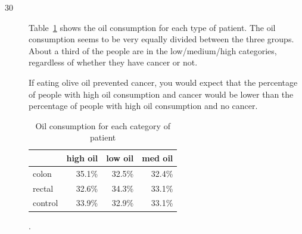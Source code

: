 \documentclass[letterpaper, landscape]{exam}
\begin{document}
\begin{description}
    \item[30]



      Table~\ref{tab:ex30b} shows the oil consumption for each type of patient.
      The oil consumption seems to be very equally divided between the three
      groups.  About a third of the people are in the low/medium/high
      categories, regardless of whether they have cancer or not.

      If eating olive oil prevented cancer, you would expect that the percentage
      of people with high oil consumption and cancer would be lower than the
      percentage of people with high oil consumption and no cancer.

      \begin{table}[H]
        \centering
        \begin{tabular}{lrrr}
          \toprule
                  & high oil & low oil & med oil \\
          \midrule
          colon   & 35.1\%   & 32.5\%  & 32.4\% \\
          rectal  & 32.6\%   & 34.3\%  & 33.1\% \\
          control & 33.9\%   & 32.9\%  & 33.1\% \\
          \bottomrule
        \end{tabular}
        \caption{Oil consumption for each category of patient}.\label{tab:ex30b}
      \end{table}



\end{description}
\end{document}
